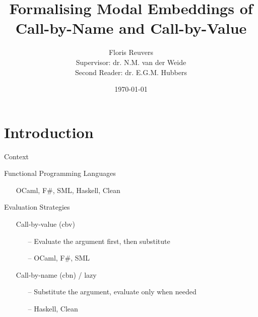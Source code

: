 \documentclass{beamer}
\title{Formalising Modal Embeddings of Call-by-Name and Call-by-Value}
\date{\today}
\author[Floris Reuvers]{Floris Reuvers \\[1ex]
  \small Supervisor: dr. N.M. van der Weide \\
  \small Second Reader: dr. E.G.M. Hubbers
}
\institute{Radboud University} %
\theoremstyle{definition}
\begin{document}
  \maketitle
  
  \section{Introduction}

  \begin{frame}{Context}
    \begin{block}{Functional Programming Languages}
      \begin{itemize}
        \item[\textbullet] OCaml, F\#, SML, Haskell, Clean
      \end{itemize}
    \end{block} \pause

    \begin{block}{Evaluation Strategies}
      \begin{itemize}
        \item[\textbullet] \alert{Call-by-value} (\textsf{cbv})
          \begin{itemize}
            \item[--] Evaluate the argument first, then substitute
            \item[--] OCaml, F\#, SML 
          \end{itemize} \pause
        \item[\textbullet] \alert{Call-by-name} (\textsf{cbn}) / lazy
          \begin{itemize}
            \item[--] Substitute the argument, evaluate only when needed
            \item[--] Haskell, Clean
          \end{itemize}
      \end{itemize}
    \end{block}
  \end{frame}
\end{document}
